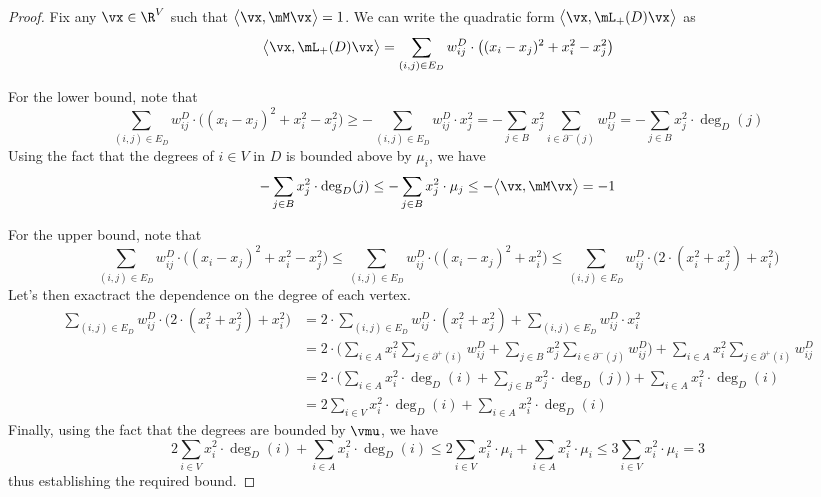 \documentclass[letterpaper]{article}
\begin{document}
\asymCutStratWidth*
\begin{proof}
Fix any $\vx \in \R^V$ such that $\big\langle \vx, \mM \vx \big\rangle = 1$. We can write the quadratic form $\big\langle \vx, \mL_{+}(D) \vx \big\rangle$ as
\begin{equation*}
\big\langle \vx, \mL_{+}(D) \vx \big\rangle
= \sum_{(i, j) \in E_D} w_{ij}^{D} \cdot \big( (x_i - x_j)^2 + x_i^2 - x_j^2 \big)
\end{equation*}

For the lower bound, note that
\begin{equation*}
\sum_{(i, j) \in E_D} w_{ij}^{D} \cdot \big( (x_i - x_j)^2 + x_i^2 - x_j^2 \big)
\geq - \sum_{(i, j) \in E_D} w_{ij}^{D} \cdot x_j^2
= - \sum_{j \in B} x_j^2 \sum_{i \in \partial^-(j)} w_{ij}^D
= - \sum_{j \in B} x_j^2 \cdot \deg_D(j)
\end{equation*}
Using the fact that the degrees of $i \in V$ in $D$ is bounded above by $\mu_i$, we have
\begin{equation*}
- \sum_{j \in B} x_j^2 \cdot \deg_D(j)
\leq - \sum_{j \in B} x_j^2 \cdot \mu_j
\leq - \big\langle \vx, \mM \vx \big\rangle
= -1
\end{equation*}

For the upper bound, note that
\begin{equation*}
\sum_{(i, j) \in E_D} w_{ij}^{D} \cdot \big( (x_i - x_j)^2 + x_i^2 - x_j^2 \big)
\leq \sum_{(i, j) \in E_D} w_{ij}^{D} \cdot \big( (x_i - x_j)^2 + x_i^2 \big)
\leq \sum_{(i, j) \in E_D} w_{ij}^{D} \cdot \big( 2 \cdot (x_i^2 + x_j^2) + x_i^2 \big)
\end{equation*}
Let's then exactract the dependence on the degree of each vertex.
\begin{align*}
\sum_{(i, j) \in E_D} w_{ij}^{D} \cdot \big( 2 \cdot (x_i^2 + x_j^2) + x_i^2 \big)
&= 2 \cdot \sum_{(i, j) \in E_D} w_{ij}^{D} \cdot (x_i^2 + x_j^2)
  + \sum_{(i, j) \in E_D} w_{ij}^D \cdot x_i^2 \\
&= 2 \cdot \bigg( \sum_{i \in A} x_i^2 \sum_{j \in \partial^{+}(i)} w_{ij}^{D} + \sum_{j \in B} x_{j}^2 \sum_{i \in \partial^{-}(j)} w_{ij}^{D} \bigg)
  + \sum_{i \in A} x_i^2 \sum_{j \in \partial^+(i)} w_{ij}^D \\
&= 2 \cdot \bigg( \sum_{i \in A} x_i^2 \cdot \deg_D(i) + \sum_{j \in B} x_{j}^2 \cdot \deg_D(j) \bigg)
  + \sum_{i \in A} x_i^2 \cdot \deg_D(i) \\
&= 2 \sum_{i \in V} x_i^2 \cdot \deg_D(i) + \sum_{i \in A} x_i^2 \cdot \deg_D(i)
\end{align*}
Finally, using the fact that the degrees are bounded by $\vmu$, we have
\begin{equation*}
2 \sum_{i \in V} x_i^2 \cdot \deg_D(i) + \sum_{i \in A} x_i^2 \cdot \deg_D(i)
\leq 2 \sum_{i \in V} x_i^2 \cdot \mu_i + \sum_{i \in A} x_i^2 \cdot \mu_i
\leq 3 \sum_{i \in V} x_i^2 \cdot \mu_i
= 3
\end{equation*}
thus establishing the required bound.
\end{proof}
\end{document}

